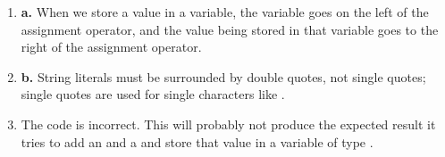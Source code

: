 
\begin{enumerate}
	\item \textbf{a.} When we store a value in a variable, the variable goes on the left of the assignment operator, and the value being stored in that variable goes to the right of the assignment operator.

  \item \textbf{b.} String literals must be surrounded by double quotes, not single quotes; single quotes are used for single characters like .

  \item The code is incorrect. This will probably not produce the expected result it tries to add an  and a  and store that value in a variable of type .

\end{enumerate}

\begin{comment}
\LevelD{Further Reading}

\begin{itemize}
\item ~
\item ~
\item ~
\end{itemize}	
\end{comment}